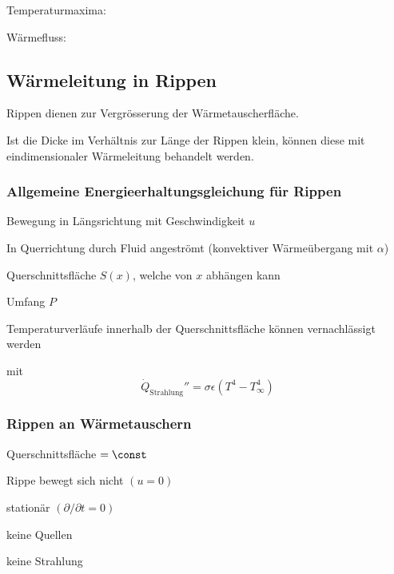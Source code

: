 		Temperaturmaxima:

		Wärmefluss:

	\subsection{Wärmeleitung in Rippen} %
		Rippen dienen zur Vergrösserung der Wärmetauscherfläche.

		Ist die Dicke im Verhältnis zur Länge der Rippen klein, können diese mit eindimensionaler Wärmeleitung behandelt werden.

		\subsubsection{Allgemeine Energieerhaltungsgleichung für Rippen} %
			\begin{tightitemize}
				\item Bewegung in Längsrichtung mit Geschwindigkeit $u$
				\item In Querrichtung durch Fluid angeströmt (konvektiver Wärmeübergang mit $\alpha$)
				\item Querschnittsfläche $S(x)$, welche von $x$ abhängen kann
				\item Umfang $P$
				\item Temperaturverläufe innerhalb der Querschnittsfläche können vernachlässigt werden
			\end{tightitemize}

			mit \[
				\dot Q_\text{Strahlung}'' = \sigma \epsilon (T^4 - T_\infty^4)
			\]

		\subsubsection{Rippen an Wärmetauschern} %
			\begin{tightitemize}
				\item Querschnittsfläche $= \const$
				\item Rippe bewegt sich nicht $(u = 0)$
				\item stationär $(\partial/\partial t = 0)$
				\item keine Quellen
				\item keine Strahlung
			\end{tightitemize}

